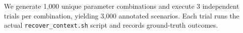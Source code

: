 We generate 1,000 unique parameter combinations and execute 3 independent trials per combination, yielding 3,000 annotated scenarios. Each trial runs the actual \texttt{recover\_context.sh} script and records ground-truth outcomes.
